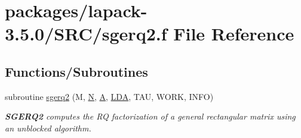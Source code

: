 \hypertarget{sgerq2_8f}{}\section{packages/lapack-\/3.5.0/\+S\+R\+C/sgerq2.f File Reference}
\label{sgerq2_8f}
\subsection*{Functions/\+Subroutines}
\begin{DoxyCompactItemize}
\item 
subroutine \hyperlink{group__realGEcomputational_ga5e9f3f3c1012927a2df1456522a0e297}{sgerq2} (M, \hyperlink{polmisc_8c_a0240ac851181b84ac374872dc5434ee4}{N}, \hyperlink{classA}{A}, \hyperlink{example__user_8c_ae946da542ce0db94dced19b2ecefd1aa}{L\+D\+A}, T\+A\+U, W\+O\+R\+K, I\+N\+F\+O)
\begin{DoxyCompactList}\small\item\em {\bfseries S\+G\+E\+R\+Q2} computes the R\+Q factorization of a general rectangular matrix using an unblocked algorithm. \end{DoxyCompactList}\end{DoxyCompactItemize}
